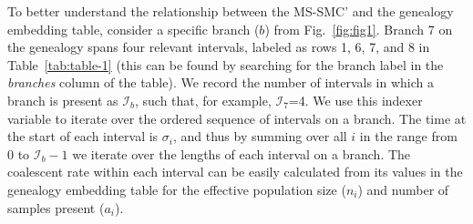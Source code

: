 \documentclass[11pt]{article}
\begin{document}
To better understand the relationship between the MS-SMC' and the genealogy
embedding table, consider a specific branch ($b$) from Fig.~\ref{fig:fig1}. 
Branch 7 on the genealogy spans four relevant intervals, 
labeled as rows 1, 6, 7, and 8 in Table~\ref{tab:table-1} 
(this can be found by searching for the branch label in the \emph{branches} 
column of the table). We record the number 
of intervals in which a branch is present as $\mathcal{I}_b$, such that,
for example, $\mathcal{I}_7$=4. We use this indexer variable to iterate
over the ordered sequence of intervals on a branch. 
The time at the start of each interval is $\sigma_i$, and thus by summing 
over all $i$ in the range from 0 to $\mathcal{I}_b - 1$ we iterate
over the lengths of each interval on a branch. 
The coalescent rate within each interval can be easily calculated from its
values in the genealogy embedding table for the
effective population size ($n_i$) and number of samples present ($a_i$).





\end{document}
